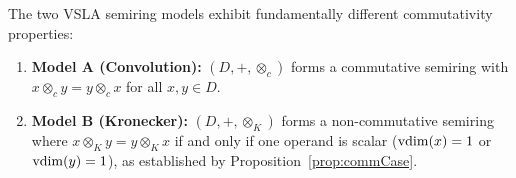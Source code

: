 \begin{lemma}\label{lem:commutativityComparison}
The two VSLA semiring models exhibit fundamentally different commutativity properties:
\begin{enumerate}
\item \textbf{Model A (Convolution):} $(D, +, \otimes_c)$ forms a commutative semiring with $x \otimes_c y = y \otimes_c x$ for all $x, y \in D$.
\item \textbf{Model B (Kronecker):} $(D, +, \otimes_K)$ forms a non-commutative semiring where $x \otimes_K y = y \otimes_K x$ if and only if one operand is scalar ($\operatorname{vdim}(x) = 1$ or $\operatorname{vdim}(y) = 1$), as established by Proposition~\ref{prop:commCase}.
\end{enumerate}
\end{lemma}
